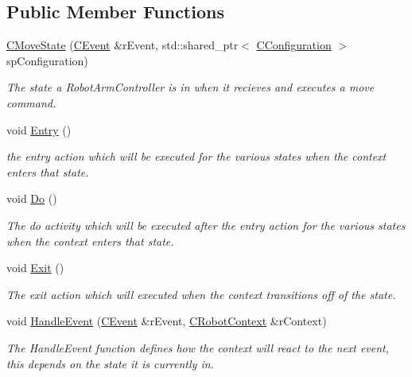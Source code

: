\subsection*{Public Member Functions}
\begin{DoxyCompactItemize}
\item 
\hyperlink{classCMoveState_a3b1e230eb78db6e622687ba3b73db8e4}{C\+Move\+State} (\hyperlink{classCEvent}{C\+Event} \&r\+Event, std\+::shared\+\_\+ptr$<$ \hyperlink{classCConfiguration}{C\+Configuration} $>$ sp\+Configuration)
\begin{DoxyCompactList}\small\item\em The state a Robot\+Arm\+Controller is in when it recieves and executes a move command. \end{DoxyCompactList}\item 
void \hyperlink{classCMoveState_ae9bda8d64d42c16e19facdfa8eb842e2}{Entry} ()
\begin{DoxyCompactList}\small\item\em the entry action which will be executed for the various states when the context enters that state. \end{DoxyCompactList}\item 
void \hyperlink{classCMoveState_acd364df1357b25ee616a7444116cf9f6}{Do} ()
\begin{DoxyCompactList}\small\item\em The do activity which will be executed after the entry action for the various states when the context enters that state. \end{DoxyCompactList}\item 
void \hyperlink{classCMoveState_ac6f27ce9a561ab6baf297e106d3f346d}{Exit} ()
\begin{DoxyCompactList}\small\item\em The exit action which will executed when the context transitions off of the state. \end{DoxyCompactList}\item 
void \hyperlink{classCMoveState_a49c6051142c4839e1a512f38859589ad}{Handle\+Event} (\hyperlink{classCEvent}{C\+Event} \&r\+Event, \hyperlink{classCRobotContext}{C\+Robot\+Context} \&r\+Context)
\begin{DoxyCompactList}\small\item\em The Handle\+Event function defines how the context will react to the next event, this depends on the state it is currently in. \end{DoxyCompactList}\end{DoxyCompactItemize}


